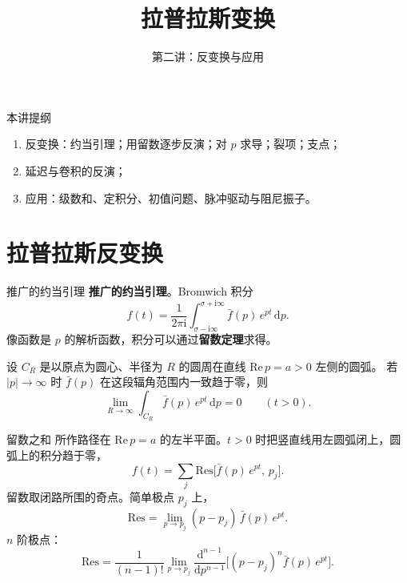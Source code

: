 \documentclass[fontset=windows, chinese, 10pt, xcolor=dvipsnames]{beamer}
\title{拉普拉斯变换}
\subtitle{第二讲：反变换与应用}
\begin{document}
\begin{frame}
  \titlepage
\end{frame}

\begin{frame}{本讲提纲}
  \begin{enumerate}
    \item 反变换：约当引理；用留数逐步反演；对 $p$ 求导；裂项；支点；
    \item 延迟与卷积的反演；
    \item 应用：级数和、定积分、初值问题、脉冲驱动与阻尼振子。
  \end{enumerate}
\end{frame}

\section{拉普拉斯反变换}

\begin{frame}{推广的约当引理}
  \textbf{推广的约当引理}。Bromwich 积分
  \begin{equation*}
    f(t)=\frac{1}{2\pi\mathrm{i}}
      \int_{\sigma-\mathrm{i}\infty}^{\sigma+\mathrm{i}\infty}
      \bar f(p)\,e^{pt}\,\mathrm{d}p.
  \end{equation*}
  像函数是 $p$ 的解析函数，积分可以通过\textbf{留数定理}求得。
  \vspace{0.3em}

  设 $C_R$ 是以原点为圆心、半径为 $R$ 的圆周在直线 $\mathrm{Re}\,p=a>0$ 左侧的圆弧。
  若 $|p|\to\infty$ 时 $\bar f(p)$ 在这段辐角范围内一致趋于零，则
  \begin{equation*}
    \lim_{R\to\infty}\int_{C_R}\bar f(p)\,e^{pt}\,\mathrm{d}p=0
    \qquad(t>0).
  \end{equation*}
\end{frame}

\begin{frame}{留数之和}
  所作路径在 $\mathrm{Re}\,p=a$ 的左半平面。$t>0$ 时把竖直线用左圆弧闭上，圆弧上的积分趋于零，
  \begin{equation*}
    f(t)=\sum_j\mathrm{Res}\bigl[\bar f(p)\,e^{pt},\,p_j\bigr].
  \end{equation*}
  留数取闭路所围的奇点。简单极点 $p_j$ 上，
  \begin{equation*}
    \mathrm{Res}
    =\lim_{p\to p_j}(p-p_j)\,\bar f(p)\,e^{pt}.
  \end{equation*}
  $n$ 阶极点：
  \begin{equation*}
    \mathrm{Res}
    =\frac{1}{(n-1)!}
      \lim_{p\to p_j}
      \frac{\mathrm{d}^{n-1}}{\mathrm{d}p^{n-1}}
      \bigl[(p-p_j)^n\bar f(p)\,e^{pt}\bigr].
  \end{equation*}
\end{frame}
\end{document}
